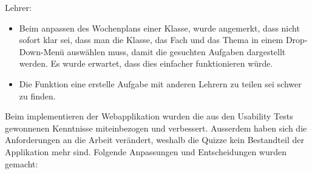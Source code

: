 Lehrer: \\
\begin{itemize}
	\item Beim anpassen des Wochenplans einer Klasse, wurde angemerkt, dass nicht sofort klar sei, dass man die Klasse, das Fach und das Thema in einem Drop-Down-Menü auswählen muss, damit die gesuchten Aufgaben dargestellt werden. Es wurde erwartet, dass dies einfacher funktionieren würde.
	\item Die Funktion eine erstelle Aufgabe mit anderen Lehrern zu teilen sei schwer zu finden.
\end{itemize}

Beim implementieren der Webapplikation wurden die aus den Usability Tests gewonnenen Kenntnisse miteinbezogen und verbessert. Ausserdem haben sich die Anforderungen an die Arbeit verändert, weshalb die Quizze kein Bestandteil der Applikation mehr sind. Folgende Anpassungen und Entscheidungen wurden gemacht: \\


